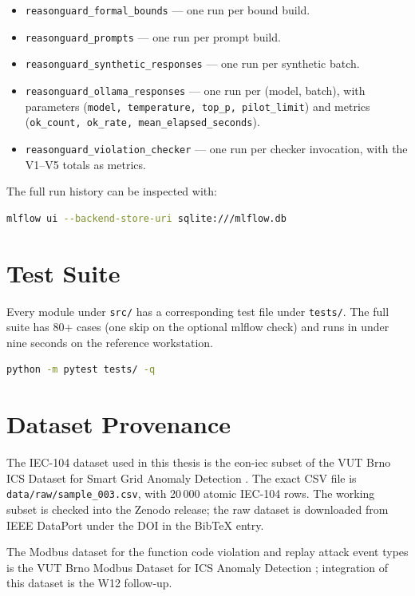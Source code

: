 \begin{itemize}
  \item \texttt{reasonguard\_formal\_bounds} — one run per bound build.
  \item \texttt{reasonguard\_prompts} — one run per prompt build.
  \item \texttt{reasonguard\_synthetic\_responses} — one run per synthetic
        batch.
  \item \texttt{reasonguard\_ollama\_responses} — one run per (model, batch),
        with parameters (\texttt{model, temperature, top\_p, pilot\_limit})
        and metrics (\texttt{ok\_count, ok\_rate, mean\_elapsed\_seconds}).
  \item \texttt{reasonguard\_violation\_checker} — one run per checker
        invocation, with the V1--V5 totals as metrics.
\end{itemize}

The full run history can be inspected with:

\begin{lstlisting}[language=bash,caption={Inspect the MLflow store.}]
mlflow ui --backend-store-uri sqlite:///mlflow.db
\end{lstlisting}

\section{Test Suite}
\label{sec:test-suite}

Every module under \texttt{src/} has a corresponding test file under
\texttt{tests/}. The full suite has 80+ cases (one skip on the optional
mlflow check) and runs in under nine seconds on the reference workstation.

\begin{lstlisting}[language=bash,caption={Run the test suite.}]
python -m pytest tests/ -q
\end{lstlisting}

\section{Dataset Provenance}
\label{sec:dataset-provenance}

The IEC-104 dataset used in this thesis is the eon-iec subset of the VUT
Brno ICS Dataset for Smart Grid Anomaly Detection
\autocite{MatousekRysavyGrofcik2022SmartGrid}. The exact CSV file is
\texttt{data/raw/sample\_003.csv}, with 20\,000 atomic IEC-104 rows. The
working subset is checked into the Zenodo release; the raw dataset is
downloaded from IEEE DataPort under the DOI in the BibTeX entry.

The Modbus dataset for the function code violation and replay attack
event types is the VUT Brno Modbus Dataset for ICS Anomaly Detection
\autocite{RysavyMatousek2021Modbus}; integration of this dataset is the
W12 follow-up.
